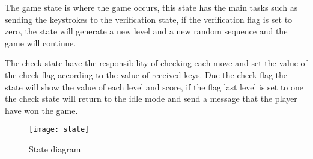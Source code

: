 \noindent
The game state is where the game occurs, this state has the main tasks such as sending the keystrokes to the verification state, if the verification flag is set to zero, the state will generate a new level and a new random sequence and the game will continue.

\noindent
The check state have the responsibility of checking each move and set the value of the check flag according to the value of received keys. Due the check flag the state will show the value of each level and score, if the flag last level is set to one the check state will return to the idle mode and send a message that the player have won the game.

\begin{figure}[!htbp]
    \centerline{\texttt{[image: state]}}
    \vspace{0cm}\caption{State diagram}
    \label{fig:state}
\end{figure}
